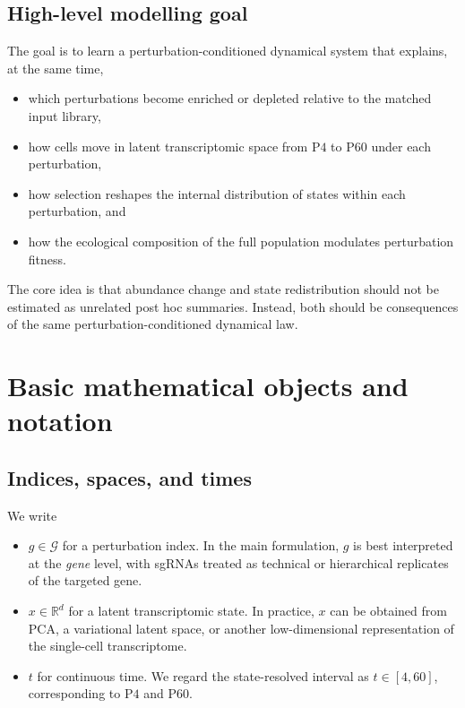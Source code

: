\documentclass[11pt]{article}
\newcommand{\R}{\mathbb{R}}
\newcommand{\G}{\mathcal{G}}
\newcommand{\1}{\mathbf{1}}
\newcommand{\Pfour}{\mathrm{P4}}
\newcommand{\Psixty}{\mathrm{P60}}
\theoremstyle{plain}
\begin{document}
\subsection{High-level modelling goal}

The goal is to learn a perturbation-conditioned dynamical system that explains, at the same time,
\begin{itemize}
    \item which perturbations become enriched or depleted relative to the matched input library,
    \item how cells move in latent transcriptomic space from $\Pfour$ to $\Psixty$ under each perturbation,
    \item how selection reshapes the internal distribution of states within each perturbation, and
    \item how the ecological composition of the full population modulates perturbation fitness.
\end{itemize}

The core idea is that abundance change and state redistribution should not be estimated as unrelated post hoc summaries. Instead, both should be consequences of the same perturbation-conditioned dynamical law.

\section{Basic mathematical objects and notation}

\subsection{Indices, spaces, and times}

We write
\begin{itemize}
    \item $g \in \G$ for a perturbation index. In the main formulation, $g$ is best interpreted at the \emph{gene} level, with sgRNAs treated as technical or hierarchical replicates of the targeted gene.
    \item $x \in \R^d$ for a latent transcriptomic state. In practice, $x$ can be obtained from PCA, a variational latent space, or another low-dimensional representation of the single-cell transcriptome.
    \item $t$ for continuous time. We regard the state-resolved interval as $t \in [4,60]$, corresponding to $\Pfour$ and $\Psixty$.
\end{itemize}
\end{document}
